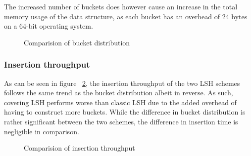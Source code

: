 The increased number of buckets does however cause an increase in the total memory usage of the data structure, as each bucket has an overhead of 24 bytes on a 64-bit operating system.

\begin{figure}[ht]
  \centering

  \caption{Comparision of bucket distribution}
  \label{fig:buckets-per-partition}
\end{figure}

\subsubsection{Insertion throughput}

As can be seen in figure ~\ref{fig:insertions-per-second}, the insertion throughput of the two LSH schemes follows the same trend as the bucket distribution albeit in reverse. As such, covering LSH performs worse than classic LSH due to the added overhead of having to construct more buckets. While the difference in bucket distribution is rather significant between the two schemes, the difference in insertion time is negligible in comparison.

\begin{figure}[ht]
  \centering

  \caption{Comparision of insertion throughput}
  \label{fig:insertions-per-second}
\end{figure}

